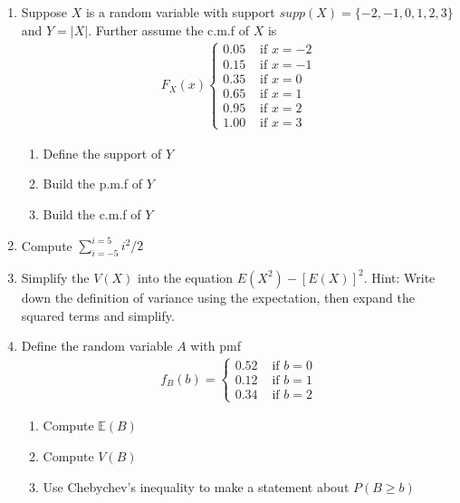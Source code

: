 \begin{enumerate}
    \item Suppose $X$ is a random variable with support $supp(X) = \{-2,-1,0,1,2,3\}$ and $Y = |X|$. Further assume the c.m.f of $X$ is 
    \begin{align}
        F_{X}(x) \begin{cases}
                     0.05 & \text{ if } x=-2\\
                     0.15 & \text{ if } x=-1\\
                     0.35 & \text{ if } x=0\\
                     0.65 & \text{ if } x=1\\
                     0.95 & \text{ if } x=2\\
                     1.00 & \text{ if } x=3
                  \end{cases}
    \end{align}
    \begin{enumerate}
            \item Define the support of $Y$
        \item Build the p.m.f of $Y$
        \item Build the c.m.f of $Y$
    \end{enumerate}
    
    \item Compute $\sum_{i=-5}^{i=5} i^{2}/2$
    
    \item Simplify the $V(X)$ into the equation $E(X^{2}) - \left[E(X)\right]^{2}$. Hint: Write down the definition of variance using the expectation, then expand the squared terms and simplify.
    
    \item Define the random variable $A$ with pmf
    \begin{align}
        f_{B}(b) = \begin{cases}
                      0.52 &\text{ if } b=0\\
                      0.12 &\text{ if } b=1\\
                      0.34 &\text{ if } b=2
                   \end{cases}
    \end{align} 
    \begin{enumerate}
        \item Compute $\mathbb{E}(B)$
        \item Compute $V(B)$
        \item Use Chebychev's inequality to make a statement about $P(B \geq b)$ 
    \end{enumerate}
    

    
\end{enumerate}

